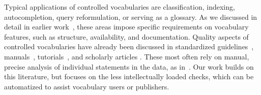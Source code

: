 





Typical applications of controlled vocabularies are classification, indexing, autocompletion, query reformulation, or serving as a glossary. As we discussed in detail in earlier work~\cite{Nagy2011}, these areas impose specific requirements on vocabulary features, such as structure, availability, and documentation. Quality aspects of controlled vocabularies have already been discussed in standardized guidelines~\cite{ISO25964-1:2011,Z39.19:2005}, manuals~\cite{Svenonius2003,Hedden2010,Aitchison2000,Harpring2010}, tutorials~\cite{Soergel2002}, and scholarly articles \cite{Coronado2009,Soergel1997,Elkin2002,Kless2010}. These most often rely on manual, precise analysis of individual statements in the data, as in~\cite{spero2008}. Our work builds on this literature, but focuses on the less intellectually loaded checks, which can be automatized to assist vocabulary users or publishers. 

